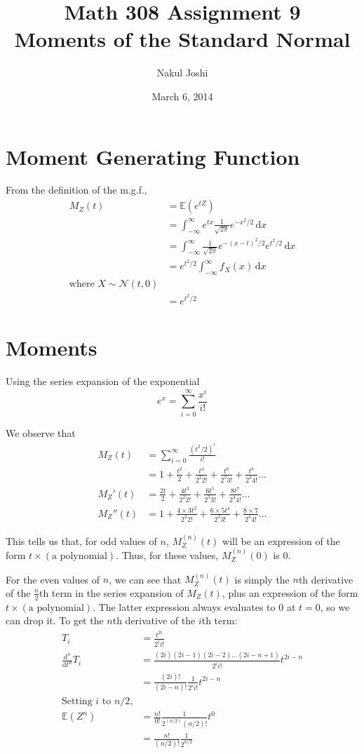 \documentclass[twocolumn]{article}
\title{Math 308 Assignment 9\\Moments of the Standard Normal}
\author{Nakul Joshi}
\date{March 6, 2014}
\newcommand{\ev}[1]{\mathbb{E}(#1)}
\newcommand{\rmd}{\mathrm{d}}
\newcommand{\intg}[4]{\int_{#1}^{#2} \! #3 \, \rmd#4}
\newcommand{\der}[2]{\frac{\rmd^#1}{\rmd #2^#1}}
\newcommand{\sfrac}[2]{
	\frac{#1}{
	2^{#2} #2!
	}
}
\begin{document}
\maketitle

\section{Moment Generating Function}
From the definition of the m.g.f.,\begin{align*}
M_Z(t)&=\ev{e^{tZ}}\\
&=\intg{-\infty}{\infty}{
	e^{tx} \frac{1}{\sqrt{2\pi}} e^{-x^2/2}
	}{x}\\
&=\intg{-\infty}{\infty}{
	\frac{1}{\sqrt{2\pi}} e^{-(x-t)^2/2} e^{t^2/2}
	}{x}\\
&=e^{t^2/2}\intg{-\infty}{\infty}{
	f_X(x)
	}{x}\\
\text{where $X \sim \mathcal{N}(t,0)$}\\
&=e^{t^2/2}
\end{align*}

\section{Moments}
Using the series expansion of the exponential\[
e^x=\sum_{i=0}^\infty \frac{x^i}{i!}
\]

We observe that \begin{align*}
M_Z(t)	&= \sum_{i=0}^\infty \frac{(t^2/2)^i}{i!} \\
		&= 1+\frac{t^2}{2}+\sfrac{t^4}{2}+\sfrac{t^6}{3}+\sfrac{t^8}{4} \ldots\\
M_Z'(t)	&= \frac{2t}{2} + \sfrac{4t^3}{2} + \sfrac{6t^5}{3}+\sfrac{8t^7}{4} \ldots\\
M_Z''(t)&= 1+\sfrac{4\times 3t^2}{2}+\sfrac{6\times 5t^4}{3}+\sfrac{8\times 7}{4} \ldots
\end{align*}

\newpage

This tells us that, for odd values of $n$, $M_Z^{(n)}(t)$ will be an expression of the form $t\times (\text{a polynomial})$. Thus, for these values, $M_Z^{(n)}(0)$ is 0.

For the even values of $n$, we can see that $M_Z^{(n)}(t)$ is simply the $n$th derivative of the $\frac{n}{2}$th term in the series expansion of $M_Z(t)$, plus an expression of the form $t\times (\text{a polynomial})$. The latter expression always evaluates to 0 at $t=0$, so we can drop it. To get the $n$th derivative of the $i$th term: \begin{align*}
	T_i &=\sfrac{t^{2i}}{i}\\
	\der{n}{t} T_i &= \sfrac{(2i)(2i-1)(2i-2)\ldots(2i-n+1)}{i} t^{2i-n}\\
	&=\frac{(2i)!}{(2i-n)!}\sfrac{1}{i}t^{2i-n}\\
	\text{Setting $i$ to $n/2$,}\\
	\ev{Z^n}&=\frac{n!}{0!}\sfrac{1}{(n/2)}t^0\\
	&=\frac{n!}{(n/2)!}\frac{1}{2^{n/2}}\\
\end{align*}
\end{document}
